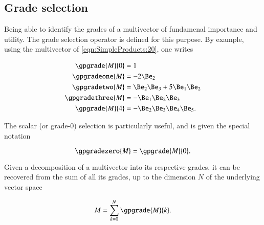 \subsection{Grade selection}

Being able to identify the grades of a multivector of fundamenal importance and utility.  The grade
selection operator is defined for this purpose.
By example, using the multivector of \cref{eqn:SimpleProducts:20}, one writes

\begin{dmath}\label{eqn:SimpleProducts:140}
\begin{aligned}
   \gpgrade{M}{0} &= 1 \\
   \gpgradeone{M} &= - 2 \Be_2 \\
   \gpgradetwo{M} &= \Be_2 \Be_3 + 5 \Be_1 \Be_2 \\
   \gpgradethree{M} &= - \Be_1 \Be_2 \Be_3 \\
   \gpgrade{M}{4} &= -\Be_2 \Be_3 \Be_4 \Be_5.
\end{aligned}
\end{dmath}

The scalar (or grade-0) selection is particularly useful, and is given the special notation

\begin{dmath}\label{eqn:SimpleProducts:180}
\gpgradezero{M} = \gpgrade{M}{0}.
\end{dmath}

Given a decomposition of a multivector into its respective grades, it can be recovered from the sum of all its grades, up to the dimension \( N \) of the underlying vector space

\begin{dmath}\label{eqn:SimpleProducts:160}
   M = \sum_{k = 0}^N \gpgrade{M}{k}.
\end{dmath}
